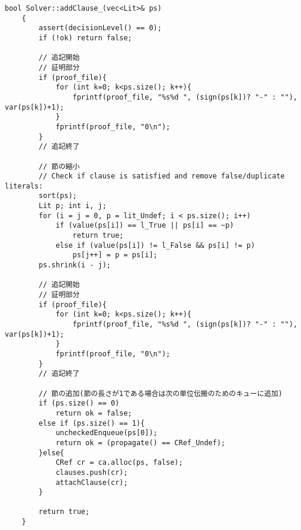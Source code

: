 \begin{lstlisting}[caption=関数addClause\_の変更(core/solver.cc), firstnumber=154]
    bool Solver::addClause_(vec<Lit>& ps)
    {
        assert(decisionLevel() == 0);
        if (!ok) return false;

        // 追記開始
        // 証明部分
        if (proof_file){
            for (int k=0; k<ps.size(); k++){
                fprintf(proof_file, "%s%d ", (sign(ps[k])? "-" : ""), var(ps[k])+1);
            }
            fprintf(proof_file, "0\n");
        }
        // 追記終了

        // 節の縮小
        // Check if clause is satisfied and remove false/duplicate literals:
        sort(ps);
        Lit p; int i, j;
        for (i = j = 0, p = lit_Undef; i < ps.size(); i++)
            if (value(ps[i]) == l_True || ps[i] == ~p)
                return true;
            else if (value(ps[i]) != l_False && ps[i] != p)
                ps[j++] = p = ps[i];
        ps.shrink(i - j);

        // 追記開始
        // 証明部分
        if (proof_file){
            for (int k=0; k<ps.size(); k++){
                fprintf(proof_file, "%s%d ", (sign(ps[k])? "-" : ""), var(ps[k])+1);
            }
            fprintf(proof_file, "0\n");
        }
        // 追記終了

        // 節の追加(節の長さが1である場合は次の単位伝搬のためのキューに追加)
        if (ps.size() == 0)
            return ok = false;
        else if (ps.size() == 1){
            uncheckedEnqueue(ps[0]);
            return ok = (propagate() == CRef_Undef);
        }else{
            CRef cr = ca.alloc(ps, false);
            clauses.push(cr);
            attachClause(cr);
        }

        return true;
    }
\end{lstlisting}

